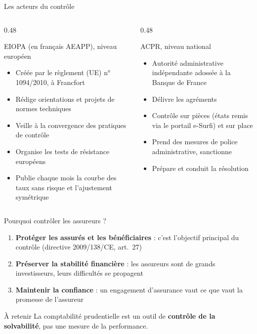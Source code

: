 \documentclass[10pt,aspectratio=169]{beamer}
\begin{document}
\begin{frame}{Les acteurs du contrôle}
\begin{columns}[T]
\begin{column}{0.48\textwidth}
\begin{block}{EIOPA (en français AEAPP), niveau européen}
\small
\begin{itemize}
  \item Créée par le règlement (UE) n° 1094/2010, à Francfort
  \item Rédige orientations et projets de normes techniques
  \item Veille à la convergence des pratiques de contrôle
  \item Organise les tests de résistance européens
  \item Publie chaque mois la courbe des taux sans risque et l'ajustement symétrique
\end{itemize}
\end{block}
\end{column}
\begin{column}{0.48\textwidth}
\begin{block}{ACPR, niveau national}
\small
\begin{itemize}
  \item Autorité administrative indépendante adossée à la Banque de France
  \item Délivre les agréments
  \item Contrôle sur pièces (états remis via le portail e-Surfi) et sur place
  \item Prend des mesures de police administrative, sanctionne
  \item Prépare et conduit la résolution
\end{itemize}
\end{block}
\end{column}
\end{columns}
\end{frame}

\begin{frame}{Pourquoi contrôler les assureurs ?}
\begin{enumerate}
  \item \textbf{Protéger les assurés et les bénéficiaires} : c'est l'objectif principal du contrôle
        (directive 2009/138/CE, art.~27)
  \item \textbf{Préserver la stabilité financière} : les assureurs sont de grands investisseurs,
        leurs difficultés se propagent
  \item \textbf{Maintenir la confiance} : un engagement d'assurance vaut ce que vaut la promesse
        de l'assureur
\end{enumerate}
\vspace{0.4cm}
\begin{alertblock}{À retenir}
La comptabilité prudentielle est un outil de \textbf{contrôle de la solvabilité}, pas une mesure
de la performance.
\end{alertblock}
\end{frame}
\end{document}
